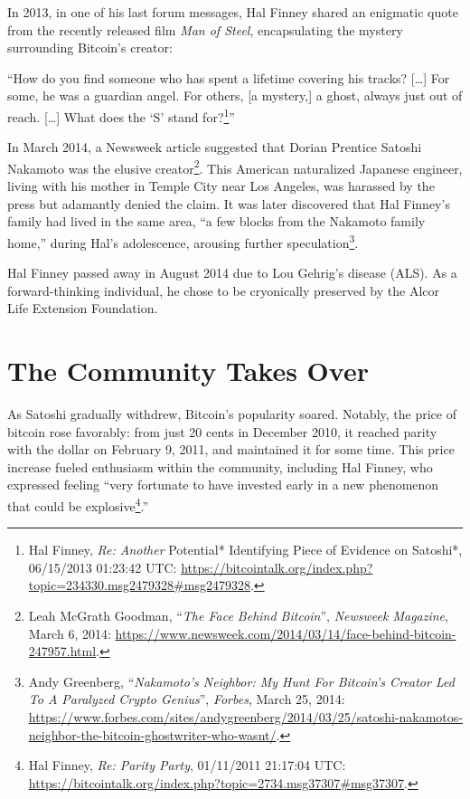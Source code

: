 \documentclass[
  a5paper,
  smalldemyvopaper,10pt,twoside,onecolumn,openright,extrafontsizes,hidelinks]{memoir}
\begin{document}
In 2013, in one of his last forum messages, Hal Finney shared an
enigmatic quote from the recently released film \emph{Man of Steel},
encapsulating the mystery surrounding Bitcoin's creator:

``How do you find someone who has spent a lifetime covering his tracks?
{[}\ldots{]} For some, he was a guardian angel. For others, {[}a
mystery,{]} a ghost, always just out of reach. {[}\ldots{]} What does
the `S' stand for?\footnote{Hal Finney, \emph{Re: Another }Potential*
  Identifying Piece of Evidence on Satoshi*, 06/15/2013 01:23:42 UTC:
  \url{https://bitcointalk.org/index.php?topic=234330.msg2479328\#msg2479328}.}''

In March 2014, a Newsweek article suggested that Dorian Prentice Satoshi
Nakamoto was the elusive creator\footnote{Leah McGrath Goodman,
  ``\emph{The Face Behind Bitcoin}'', \emph{Newsweek Magazine}, March 6,
  2014:
  \url{https://www.newsweek.com/2014/03/14/face-behind-bitcoin-247957.html}.}.
This American naturalized Japanese engineer, living with his mother in
Temple City near Los Angeles, was harassed by the press but adamantly
denied the claim. It was later discovered that Hal Finney's family had
lived in the same area, ``a few blocks from the Nakamoto family home,''
during Hal's adolescence, arousing further speculation\footnote{Andy
  Greenberg, ``\emph{Nakamoto's Neighbor: My Hunt For Bitcoin's Creator
  Led To A Paralyzed Crypto Genius}'', \emph{Forbes}, March 25, 2014:
  \url{https://www.forbes.com/sites/andygreenberg/2014/03/25/satoshi-nakamotos-neighbor-the-bitcoin-ghostwriter-who-wasnt/}.}.

Hal Finney passed away in August 2014 due to Lou Gehrig's disease (ALS).
As a forward-thinking individual, he chose to be cryonically preserved
by the Alcor Life Extension Foundation.

\section*{The Community Takes Over}\label{la-communaute-prend-le-relai}


As Satoshi gradually withdrew, Bitcoin's popularity soared. Notably, the
price of bitcoin rose favorably: from just 20 cents in December 2010, it
reached parity with the dollar on February 9, 2011, and maintained it
for some time. This price increase fueled enthusiasm within the
community, including Hal Finney, who expressed feeling ``very fortunate
to have invested early in a new phenomenon that could be
explosive\footnote{Hal Finney, \emph{Re: Parity Party}, 01/11/2011
  21:17:04 UTC:
  \url{https://bitcointalk.org/index.php?topic=2734.msg37307\#msg37307}.}.''
\end{document}
